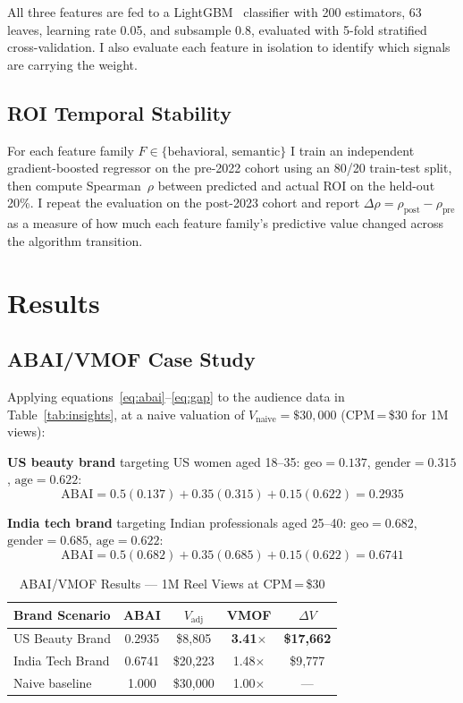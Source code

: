 \documentclass[conference]{IEEEtran}
\begin{document}
All three features are fed to a LightGBM~\cite{ke2017} classifier with
200 estimators, 63 leaves, learning rate 0.05, and subsample 0.8, evaluated
with 5-fold stratified cross-validation. I also evaluate each feature in
isolation to identify which signals are carrying the weight.

\subsection{ROI Temporal Stability}

For each feature family $F \in \{\text{behavioral, semantic}\}$ I train
an independent gradient-boosted regressor on the pre-2022 cohort using an
80/20 train-test split, then compute Spearman~$\rho$ between predicted and
actual ROI on the held-out 20\%. I repeat the evaluation on the post-2023
cohort and report $\Delta\rho = \rho_{\text{post}} - \rho_{\text{pre}}$ as
a measure of how much each feature family's predictive value changed across
the algorithm transition.

\section{Results}

\subsection{ABAI/VMOF Case Study}

Applying equations~\eqref{eq:abai}--\eqref{eq:gap} to the audience data
in Table~\ref{tab:insights}, at a naive valuation of $V_{\text{naive}} =
\$30{,}000$ (CPM\,=\,\$30 for 1M views):

\textbf{US beauty brand} targeting US women aged 18--35:
$\text{geo}=0.137$, $\text{gender}=0.315$, $\text{age}=0.622$:
\[
\text{ABAI} = 0.5(0.137)+0.35(0.315)+0.15(0.622) = 0.2935
\]

\textbf{India tech brand} targeting Indian professionals aged 25--40:
$\text{geo}=0.682$, $\text{gender}=0.685$, $\text{age}=0.622$:
\[
\text{ABAI} = 0.5(0.682)+0.35(0.685)+0.15(0.622) = 0.6741
\]

\begin{table}[t]
\caption{ABAI/VMOF Results --- 1M Reel Views at CPM\,=\,\$30}
\label{tab:vmof}
\centering
\begin{tabular}{lcccc}
\toprule
\textbf{Brand Scenario} & \textbf{ABAI} & $V_{\text{adj}}$ & \textbf{VMOF} & $\Delta V$ \\
\midrule
US Beauty Brand & 0.2935 & \$8{,}805 & \textbf{3.41$\times$} & \textbf{\$17{,}662} \\
India Tech Brand & 0.6741 & \$20{,}223 & 1.48$\times$ & \$9{,}777 \\
Naive baseline & 1.000 & \$30{,}000 & 1.00$\times$ & --- \\
\bottomrule
\end{tabular}
\end{table}
\end{document}
